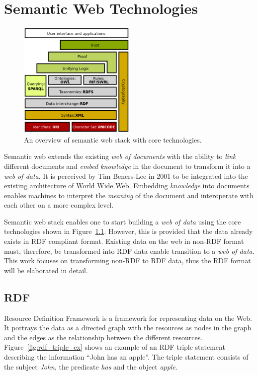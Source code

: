 \chapter{Semantic Web Technologies}
\label{chap:semantic_web}


\begin{figure}[htbp]
    \centering
    \includegraphics[width=0.5\textwidth]{fig/Semantic_web_stack.svg.png}
    \caption{An overview of semantic web stack with core technologies\cite{sem_web_stack}.}
    \label{fig:sem_web_stack}
\end{figure}

Semantic web extends the existing \emph{web of documents} with the ability 
to \emph{link} different documents and \emph{embed knowledge} in the document
to transform it into a \emph{web of data}. It is perceived by Tim Beners-Lee in 
2001\cite{bernerslee2001semantic} to be integrated into the existing architecture 
of World Wide Web. Embedding \emph{knowledge} into documents enables machines to
interpret the \emph{meaning} of the document and interoperate with each other on 
a more complex level.

Semantic web stack enables one to start building a \emph{web of data} using 
the core technologies shown in Figure~\ref{fig:sem_web_stack}. 
However, this is provided that the data already exists in RDF compliant format.
Existing data on the web in non-RDF format must, therefore, be transformed 
into RDF data enable transition to a \emph{web of data}. This work 
focuses on transforming non-RDF to RDF data, thus the RDF format will be elaborated 
in detail. 



\section{RDF}
Resource Definition Framework \cite{rdf_concepts} is a framework for representing data on the Web.
It portrays the data as a directed graph with the resources as nodes in the graph and the
edges as the relationship between the different resources.
Figure~\ref{fig:rdf_triple_ex} shows an example of an RDF triple statement describing
the information “John has an apple”.
The triple statement consists of the subject \textit{John}, the predicate \textit{has}
and the object \textit{apple}.

